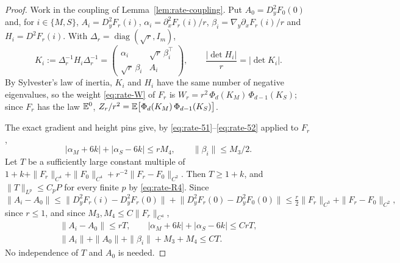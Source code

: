 \begin{proof}
Work in the coupling of Lemma~\ref{lem:rate-coupling}. Put $A_0=D_y^2F_0(0)$ and, for $i\in\{M,S\}$, $A_i=D_y^2F_r(i)$, $\alpha_i=\partial_x^2F_r(i)/r$, $\beta_i=\nabla_y\partial_xF_r(i)/r$ and $H_i=D^2F_r(i)$. With $\Delta_r=\operatorname{diag}(\sqrt r,I_m)$,
\begin{equation}\label{eq:rate-Ki}
K_i:=\Delta_r^{-1}H_i\Delta_r^{-1}=\begin{pmatrix}\alpha_i&\sqrt r\,\beta_i^{\top}\\ \sqrt r\,\beta_i&A_i\end{pmatrix},\qquad \frac{|\det H_i|}r=|\det K_i| .
\end{equation}
By Sylvester's law of inertia, $K_i$ and $H_i$ have the same number of negative eigenvalues, so the weight \eqref{eq:rate-W} of $F_r$ is $W_r=r^2\,\Phi_d(K_M)\,\Phi_{d-1}(K_S)$; since $F_r$ has the law $\mathbb E^0$, $Z_r/r^2=\mathbb E\bigl[\Phi_d(K_M)\,\Phi_{d-1}(K_S)\bigr]$.

The exact gradient and height pins give, by \eqref{eq:rate-51}--\eqref{eq:rate-52} applied to $F_r$,
\begin{equation}\label{eq:rate-R8}
|\alpha_M+6k|+|\alpha_S-6k|\le rM_4,\qquad \|\beta_i\|\le M_3/2 .
\end{equation}
Let $T$ be a sufficiently large constant multiple of $1+k+\|F_r\|_{C^4}+\|F_0\|_{C^4}+r^{-2}\|F_r-F_0\|_{C^2}$. Then $T\ge1+k$, and $\|T\|_{L^p}\le C_pP$ for every finite $p$ by \eqref{eq:rate-R4}. Since
\[
\|A_i-A_0\|\le\bigl\|D_y^2F_r(i)-D_y^2F_r(0)\bigr\|+\bigl\|D_y^2F_r(0)-D_y^2F_0(0)\bigr\|\le\tfrac r2\|F_r\|_{C^3}+\|F_r-F_0\|_{C^2},
\]
since $r\le1$, and since $M_3,M_4\le C\|F_r\|_{C^4}$,
\begin{equation}\label{eq:rate-R9}
\begin{gathered}
\|A_i-A_0\|\le rT,\qquad |\alpha_M+6k|+|\alpha_S-6k|\le CrT,\\
\|A_i\|+\|A_0\|+\|\beta_i\|+M_3+M_4\le CT .
\end{gathered}
\end{equation}
No independence of $T$ and $A_0$ is needed.


\end{proof}
